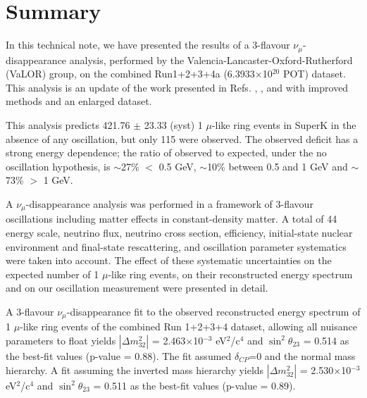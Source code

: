 \clearpage


\section {Summary}
\label{sec:summary}

In this technical note,
we have presented the results of a 3-flavour $\nu_{\mu}$-disappearance analysis,
performed by the Valencia-Lancaster-Oxford-Rutherford (VaLOR) group,
on the combined Run1+2+3+4a (6.3933$\times$10$^{20}$ POT) dataset.
This analysis is an update of the work presented in
Refs. \cite{OurRun1DisappAnalysis}, \cite{OurRun12DisappAnalysis}, 
\cite{OurRun12DisappAnalysis3Flavour} and
\cite{OurRun123DisappAnalysis3Flavour}
with improved methods and an enlarged dataset.

This analysis predicts 421.76 $\pm$ 23.33 (syst)
1 $\mu$-like ring events in SuperK in the absence of any oscillation,
but only 115 were observed. The observed deficit has a strong energy dependence;
the ratio of observed to expected, under the no oscillation hypothesis, is
$\sim$27\% $<$ 0.5 GeV, 
$\sim$10\% between 0.5 and 1 GeV and 
$\sim$73\% $>$ 1 GeV.

A $\nu_{\mu}$-disappearance analysis was performed 
in a framework of 3-flavour oscillations including matter effects in constant-density matter.
A total of 44 energy scale, neutrino flux, neutrino cross section,
efficiency, initial-state nuclear environment and final-state rescattering,
and oscillation parameter systematics were taken into account. 
The effect of these systematic uncertainties on the expected number of 1 $\mu$-like ring events,
on their reconstructed energy spectrum and on our oscillation measurement were presented in detail.

A 3-flavour $\nu_{\mu}$-disappearance fit to
the observed reconstructed energy spectrum of 1 $\mu$-like ring events of the combined Run 1+2+3+4 dataset,
allowing all nuisance parameters to float
yields
$|\Delta m^{2}_{32}|$ = 2.463$\times$10$^{-3}$ eV$^{2}$/c$^{4}$  and
$\sin^{2}\theta_{23}$ = 0.514
as the best-fit values (p-value = 0.88).
The fit assumed $\delta_{CP}$=0 and the normal mass hierarchy.
A fit assuming the inverted mass hierarchy yields
$|\Delta m^{2}_{32}|$ = 2.530$\times$10$^{-3}$ eV$^{2}$/c$^{4}$  and
$\sin^{2}\theta_{23}$ = 0.511
as the best-fit values (p-value = 0.89).

